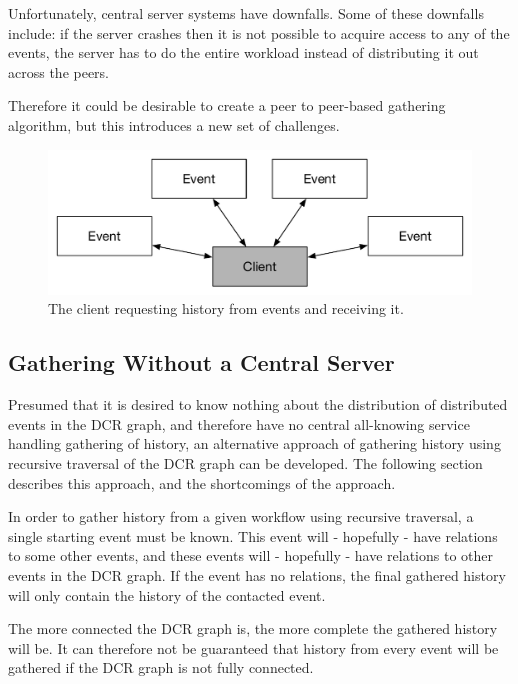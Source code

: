     Unfortunately, central server systems have downfalls. Some of these downfalls include: if the server crashes then it is not possible to acquire access to any of the events, the server has to do the entire workload instead of distributing it out across the peers. 
    
    Therefore it could be desirable to create a peer to peer-based gathering algorithm, but this introduces a new set of challenges.
    
    \begin{figure}[H]
		\centering
		\includegraphics[height=\textheight/6]{4connect/images/server-contacts-events.pdf}
		\caption{The client requesting history from events and receiving it.}
		\label{fig:connecting:server-contacts-events}
	\end{figure}
    
    \subsection{Gathering Without a Central Server}
	Presumed that it is desired to know nothing about the distribution of distributed events in the DCR graph, and therefore have no central all-knowing service handling gathering of history, an alternative approach of gathering history using recursive traversal of the DCR graph can be developed. The following section describes this approach, and the shortcomings of the approach. 
	
	In order to gather history from a given workflow using recursive traversal, a single starting event must be known. This event will - hopefully - have relations to some other events, and these events will - hopefully - have relations to other events in the DCR graph.
	If the event has no relations, the final gathered history will only contain the history of the contacted event. 
	
	The more connected the DCR graph is, the more complete the gathered history will be. It can therefore not be guaranteed that history from every event will be gathered if the DCR graph is not fully connected.  
	

